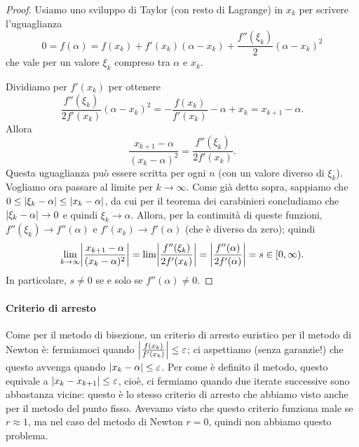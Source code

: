 \documentclass[a4paper]{report}
\DeclarePairedDelimiter{\abs}{\lvert}{\rvert}
\theoremstyle{definition}
\theoremstyle{remark}
\begin{document}
\begin{proof}
Usiamo uno sviluppo di Taylor (con resto di Lagrange) in $x_k$ per scrivere l'uguaglianza
\begin{equation} \label{sviluppo Taylor per dimostrazione conv. quadratica Newton}
    0 = f(\alpha) = f(x_k) + f'(x_k)(\alpha-x_k) + \frac{f''(\xi_k)}{2}(\alpha-x_k)^2    
\end{equation}
che vale per un valore $\xi_k$ compreso tra $\alpha$ e $x_k$.

Dividiamo per $f'(x_k)$ per ottenere
\[
\frac{f''(\xi_k)}{2f'(x_k)}(\alpha-x_k)^2 = - \frac{f(x_k)}{f'(x_k)} - \alpha + x_k   =  x_{k+1} - \alpha.
\]
Allora
\[
\frac{x_{k+1} - \alpha}{(x_k-\alpha)^2} = \frac{f''(\xi_k)}{2f'(x_k)}.
\]
Questa uguaglianza può essere scritta per ogni $n$ (con un valore diverso di $\xi_k$). Vogliamo ora passare al limite per $k \to \infty$. Come già detto sopra, sappiamo che $0 \leq \abs{\xi_k - \alpha} \leq \abs{x_k - \alpha}$, da cui per il teorema dei carabinieri concludiamo che $\abs{\xi_k - \alpha} \to 0$ e quindi $\xi_k \to \alpha$. Allora, per la continuità di queste funzioni, $f''(\xi_k) \to f''(\alpha)$ e $f'(x_k) \to f'(\alpha)$ (che è diverso da zero); quindi
\[
\lim_{k\to\infty} \abs*{\frac{x_{k+1} - \alpha}{(x_k-\alpha)^2}} = \lim \abs*{\frac{f''(\xi_k)}{2f'(x_k)}} = \abs*{\frac{f''(\alpha)}{2f'(\alpha)}} = s \in [0,\infty).
\]
In particolare, $s\neq 0$ se e solo se $f''(\alpha)\neq 0$.
\end{proof}

\paragraph{Criterio di arresto} Come per il metodo di bisezione, un criterio di arresto euristico per il metodo di Newton è: fermiamoci quando $\abs*{\frac{f(x_k)}{f'(x_k)}} \leq \varepsilon$; ci aspettiamo (senza garanzie!) che questo avvenga quando $\abs{x_k - \alpha} \leq \varepsilon$. Per come è definito il metodo, questo equivale a $\abs{x_k - x_{k+1}} \leq \varepsilon$, cioè, ci fermiamo quando due iterate successive sono abbastanza vicine: questo è lo stesso criterio di arresto che abbiamo visto anche per il metodo del punto fisso. Avevamo visto che questo criterio funziona male se $r\approx 1$, ma nel caso del metodo di Newton $r=0$, quindi non abbiamo questo problema.
\end{document}
